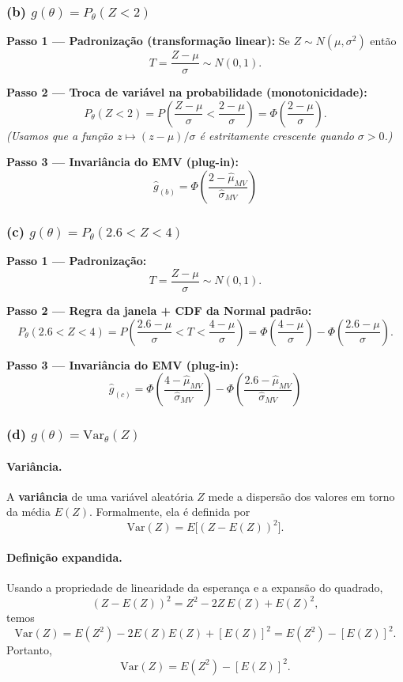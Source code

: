 \subsubsection*{(b) \; $g(\theta)=P_\theta(Z<2)$}

\textbf{Passo 1 — Padronização (transformação linear):}
Se $Z\sim N(\mu,\sigma^2)$ então
\[
T=\frac{Z-\mu}{\sigma}\sim N(0,1).
\]

\textbf{Passo 2 — Troca de variável na probabilidade (monotonicidade):}
\[
P_\theta(Z<2)=P\!\left(\frac{Z-\mu}{\sigma}<\frac{2-\mu}{\sigma}\right)
=\Phi\!\left(\frac{2-\mu}{\sigma}\right).
\]
\emph{(Usamos que a função $z\mapsto (z-\mu)/\sigma$ é estritamente crescente quando $\sigma>0$.)}

\textbf{Passo 3 — Invariância do EMV (plug-in):}
\[
\boxed{\;\widehat g_{(b)}=\Phi\!\left(\frac{2-\widehat\mu_{MV}}{\widehat\sigma_{MV}}\right)\;}
\]

\subsubsection*{(c) \; $g(\theta)=P_\theta(2.6<Z<4)$}

\textbf{Passo 1 — Padronização:}
\[
T=\frac{Z-\mu}{\sigma}\sim N(0,1).
\]

\textbf{Passo 2 — Regra da janela + CDF da Normal padrão:}
\[
P_\theta(2.6<Z<4)=P\!\left(\frac{2.6-\mu}{\sigma}<T<\frac{4-\mu}{\sigma}\right)
=\Phi\!\left(\frac{4-\mu}{\sigma}\right)-\Phi\!\left(\frac{2.6-\mu}{\sigma}\right).
\]

\textbf{Passo 3 — Invariância do EMV (plug-in):}
\[
\boxed{\;\widehat g_{(c)}=\Phi\!\left(\frac{4-\widehat\mu_{MV}}{\widehat\sigma_{MV}}\right)
-\Phi\!\left(\frac{2.6-\widehat\mu_{MV}}{\widehat\sigma_{MV}}\right)\;}
\]

\subsubsection*{(d) \; $g(\theta)=\mathrm{Var}_\theta(Z)$}
\paragraph{Variância.}
A \textbf{variância} de uma variável aleatória $Z$ mede a dispersão dos valores em torno da média $E(Z)$.
Formalmente, ela é definida por
\[
\mathrm{Var}(Z) = E\!\big[(Z - E(Z))^2\big].
\]

\paragraph{Definição expandida.}
Usando a propriedade de linearidade da esperança e a expansão do quadrado,
\[
(Z - E(Z))^2 = Z^2 - 2Z\,E(Z) + E(Z)^2,
\]
temos
\[
\mathrm{Var}(Z) = E(Z^2) - 2E(Z)E(Z) + [E(Z)]^2 = E(Z^2) - [E(Z)]^2.
\]
Portanto,
\[
\boxed{\;\mathrm{Var}(Z) = E(Z^2) - [E(Z)]^2.\;}
\]

